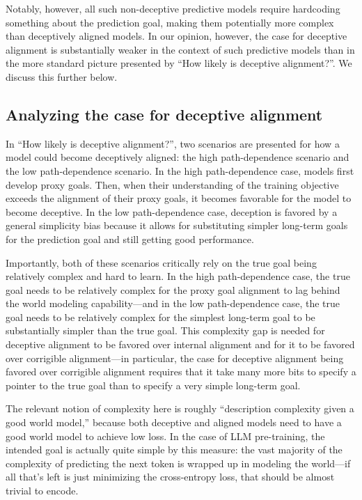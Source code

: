 {Notably, however, all such non-deceptive predictive models require hardcoding something about the prediction goal, making them potentially more complex than deceptively aligned models. In our opinion, however, the case for deceptive alignment is substantially weaker in the context of such predictive models than in the more standard picture presented by ``How likely is deceptive alignment?\cite{TODO: cite https://www.alignmentforum.org/posts/A9NxPTwbw6r6Awuwt/how-likely-is-deceptive-alignment}''. We discuss this further below.


\subsection{Analyzing the case for deceptive alignment}

In ``How likely is deceptive alignment?\cite{TODO: cite https://www.alignmentforum.org/posts/A9NxPTwbw6r6Awuwt/how-likely-is-deceptive-alignment}'', two scenarios are presented for how a model could become deceptively aligned: the high path-dependence scenario and the low path-dependence scenario. In the high path-dependence case, models first develop proxy goals. Then, when their understanding of the training objective exceeds the alignment of their proxy goals, it becomes favorable for the model to become deceptive. In the low path-dependence case, deception is favored by a general simplicity bias because it allows for substituting simpler long-term goals for the prediction goal and still getting good performance.

Importantly, both of these scenarios critically rely on the true goal being relatively complex and hard to learn. In the high path-dependence case, the true goal needs to be relatively complex for the proxy goal alignment to lag behind the world modeling capability---and in the low path-dependence case, the true goal needs to be relatively complex for the simplest long-term goal to be substantially simpler than the true goal. This complexity gap is needed for deceptive alignment to be favored over internal alignment and for it to be favored over corrigible alignment---in particular, the case for deceptive alignment being favored over corrigible alignment requires that it take many more bits to specify a pointer to the true goal than to specify a very simple long-term goal.

The relevant notion of complexity here is roughly ``description complexity given a good world model,'' because both deceptive and aligned models need to have a good world model to achieve low loss. In the case of LLM pre-training, the intended goal is actually quite simple by this measure: the vast majority of the complexity of predicting the next token is wrapped up in modeling the world---if all that's left is just minimizing the cross-entropy loss, that should be almost trivial to encode.

}
